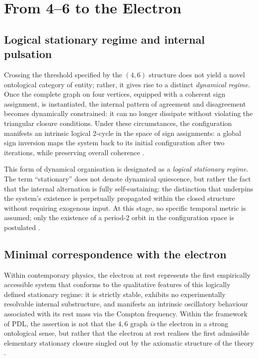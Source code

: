 \documentclass[11pt,a4paper]{article}
\begin{document}
\section{From 4--6 to the Electron}
\label{sec:four_six_electron}

\subsection{Logical stationary regime and internal pulsation}
\label{subsec:logical_stationary}

Crossing the threshold specified by the \((4,6)\) structure does not yield a novel ontological category of entity; rather, it gives rise to a distinct \emph{dynamical regime}. Once the complete graph on four vertices, equipped with a coherent sign assignment, is instantiated, the internal pattern of agreement and disagreement becomes dynamically constrained: it can no longer dissipate without violating the triangular closure conditions. Under these circumstances, the configuration manifests an intrinsic logical 2-cycle in the space of sign assignments: a global sign inversion maps the system back to its initial configuration after two iterations, while preserving overall coherence
\citep{PDL_Main_2026,PDL_intro}.

This form of dynamical organisation is designated as a \emph{logical stationary regime}. The term “stationary” does not denote dynamical quiescence, but rather the fact that the internal alternation is fully self-sustaining: the distinction that underpins the system’s existence is perpetually propagated within the closed structure without requiring exogenous input. At this stage, no specific temporal metric is assumed; only the existence of a period-2 orbit in the configuration space is postulated
\citep{PDL_Main_2026,PDL_position}.

\subsection{Minimal correspondence with the electron}
\label{subsec:electron_correspondence}

Within contemporary physics, the electron at rest represents the first empirically accessible system that conforms to the qualitative features of this logically defined stationary regime: it is strictly stable, exhibits no experimentally resolvable internal substructure, and manifests an intrinsic oscillatory behaviour associated with its rest mass via the Compton frequency. Within the framework of PDL, the assertion is not that the \(4,6\) graph \emph{is} the electron in a strong ontological sense, but rather that the electron at rest realises the first admissible elementary stationary closure singled out by the axiomatic structure of the theory \citep{PDL_Main_2026,PDL_intro}.
\end{document}
